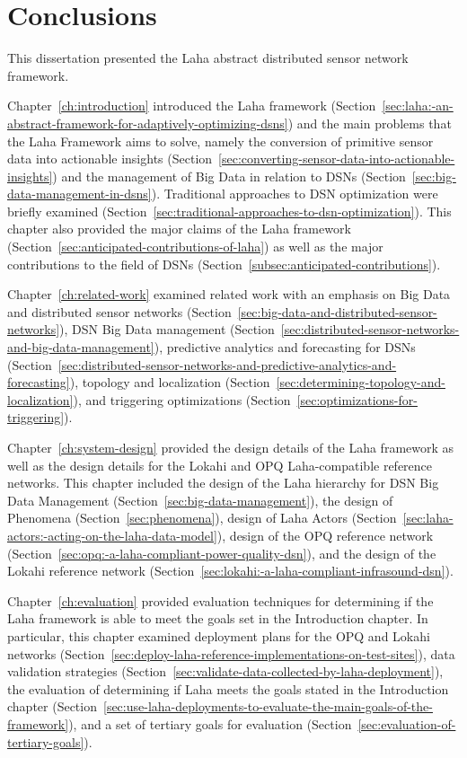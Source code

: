 \chapter{Conclusions}\label{ch:conclusion}

This dissertation presented the Laha abstract distributed sensor network framework.

Chapter~\ref{ch:introduction} introduced the Laha framework (Section~\ref{sec:laha:-an-abstract-framework-for-adaptively-optimizing-dsns}) and the main problems that the Laha Framework aims to solve, namely the conversion of primitive sensor data into actionable insights (Section~\ref{sec:converting-sensor-data-into-actionable-insights}) and the management of Big Data in relation to DSNs (Section~\ref{sec:big-data-management-in-dsns}). Traditional approaches to DSN optimization were briefly examined (Section~\ref{sec:traditional-approaches-to-dsn-optimization}). This chapter also provided the major claims of the Laha framework (Section~\ref{sec:anticipated-contributions-of-laha}) as well as the major contributions to the field of DSNs (Section~\ref{subsec:anticipated-contributions}).

Chapter~\ref{ch:related-work} examined related work with an emphasis on Big Data and distributed sensor networks (Section~\ref{sec:big-data-and-distributed-sensor-networks}), DSN Big Data management (Section~\ref{sec:distributed-sensor-networks-and-big-data-management}), predictive analytics and forecasting for DSNs (Section~\ref{sec:distributed-sensor-networks-and-predictive-analytics-and-forecasting}), topology and localization (Section~\ref{sec:determining-topology-and-localization}), and triggering optimizations (Section~\ref{sec:optimizations-for-triggering}).

Chapter~\ref{ch:system-design} provided the design details of the Laha framework as well as the design details for the Lokahi and OPQ Laha-compatible reference networks. This chapter included the design of the Laha hierarchy for DSN Big Data Management (Section~\ref{sec:big-data-management}), the design of Phenomena (Section~\ref{sec:phenomena}), design of Laha Actors (Section~\ref{sec:laha-actors:-acting-on-the-laha-data-model}), design of the OPQ reference network (Section~\ref{sec:opq:-a-laha-compliant-power-quality-dsn}), and the design of the Lokahi reference network (Section~\ref{sec:lokahi:-a-laha-compliant-infrasound-dsn}).

Chapter~\ref{ch:evaluation} provided evaluation techniques for determining if the Laha framework is able to meet the goals set in the Introduction chapter. In particular, this chapter examined deployment plans for the OPQ and Lokahi networks (Section~\ref{sec:deploy-laha-reference-implementations-on-test-sites}), data validation strategies (Section~\ref{sec:validate-data-collected-by-laha-deployment}), the evaluation of determining if Laha meets the goals stated in the Introduction chapter (Section~\ref{sec:use-laha-deployments-to-evaluate-the-main-goals-of-the-framework}), and a set of tertiary goals for evaluation (Section~\ref{sec:evaluation-of-tertiary-goals}).

